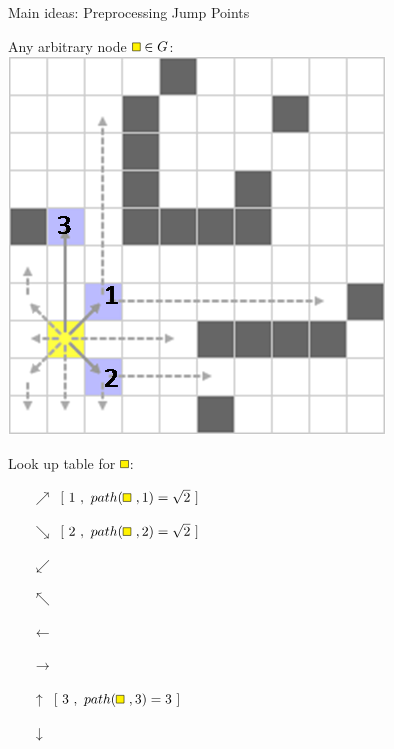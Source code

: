 \documentclass{presentation}
\begin{document}
\begin{frame}
\end{frame}



\begin{frame}{Main ideas: Preprocessing Jump Points}
	\begin{minipage}{0.45\textwidth}
		Any arbitrary node $\tikz{\path[draw=black,fill=yellow] (0,0) rectangle (2mm,2mm);}\in G$:\\
		\vspace{3mm}
		\includegraphics[width=\textwidth]{figures/jps_geschnitten/1(yellow).png}
	\end{minipage}%
	\hfill%
	\begin{minipage}{0.45\textwidth}
		Look up table for $\tikz{\path[draw=black,fill=yellow] (0,0) rectangle (2mm,2mm);}$:\\
		\vspace{3mm}
		\begin{itemize}
		\pause
		\item[$\nearrow$] $[\ 1\ ,\ path(\tikz{\path[draw=black,fill=yellow] (0,0) rectangle (2mm,2mm);}\ ,1)=\sqrt{2}\ ]$
		\pause
		\item[$\searrow$] $[\ 2\ ,\ path(\tikz{\path[draw=black,fill=yellow] (0,0) rectangle (2mm,2mm);}\ ,2)=\sqrt{2}\ ]$
		\pause
		\item[$\swarrow$]
		\pause
		\item[$\nwarrow$] 
		\item[$\leftarrow$]
		\item[$\rightarrow$]
		\item[$\uparrow$] $[\ 3\ ,\ path(\tikz{\path[draw=black,fill=yellow] (0,0) rectangle (2mm,2mm);}\ ,3)=3\ ]$
		\item[$\downarrow$]
		\end{itemize}
	\end{minipage}
\end{frame}
\end{document}
